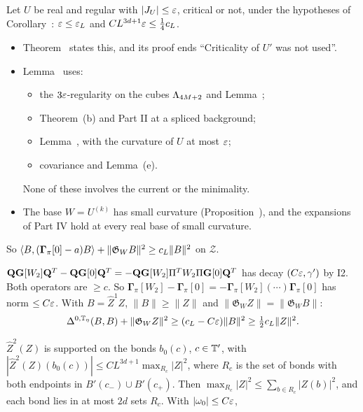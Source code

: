 \begin{detail}\label{d8:cg-real}
Let $U$ be real and regular with $|J_U|\le\varepsilon$, critical or not, under the hypotheses of Corollary~: $\varepsilon\le\varepsilon_L$ and $CL^{3d+1}\varepsilon\le\frac14c_L$.
\begin{step}
\begin{itemize}
\item Theorem~ states this, and its proof ends ``Criticality of $U'$ was not used''.
\item Lemma~ uses:
  \begin{itemize}
  \item the $3\varepsilon$-regularity on the cubes $\Lambda_{4M+2}$ and Lemma~;
  \item Theorem~(b) and Part II at a spliced background;
  \item Lemma~, with the curvature of $U$ at most $\varepsilon$;
  \item covariance and Lemma~(e).
  \end{itemize}
  None of these involves the current or the minimality.
\item The base $W=U^{(k)}$ has small curvature (Proposition~), and the expansions of Part IV hold at every real base of small curvature.
\end{itemize}
So $\langle B,(\boldsymbol\Gamma_\pi[0]-a)B\rangle+\|\mathfrak G_WB\|^2\ge c_L\|B\|^2$ on $\mathcal Z$.
\end{step}
\begin{step}
$\mathbf Q\mathbf G[W_2]\mathbf Q^T-\mathbf Q\mathbf G[0]\mathbf Q^T=-\mathbf Q\mathbf G[W_2]\Pi^TW_2\Pi\mathbf G[0]\mathbf Q^T$ has decay $(C\varepsilon,\gamma')$ by I2. Both operators are $\ge c$. So $\boldsymbol\Gamma_\pi[W_2]-\boldsymbol\Gamma_\pi[0]=-\boldsymbol\Gamma_\pi[W_2](\cdots)\boldsymbol\Gamma_\pi[0]$ has norm $\le C\varepsilon$. With $B=\hat Z^1Z$, $\|B\|\ge\|Z\|$ and $\|\mathfrak G_WZ\|=\|\mathfrak G_WB\|$:
\[
\Delta^{0,\mathbb T_\eta}(B,B)+\|\mathfrak G_WZ\|^2\ge(c_L-C\varepsilon)\|B\|^2\ge\tfrac12c_L\|Z\|^2 .
\]
\end{step}
\begin{step}
$\hat Z^2(Z)$ is supported on the bonds $b_0(c)$, $c\in\mathbb T'$, with $|\hat Z^2(Z)(b_0(c))|\le CL^{3d+1}\max_{R_c}|Z|^2$, where $R_c$ is the set of bonds with both endpoints in $B'(c_-)\cup B'(c_+)$. Then $\max_{R_c}|Z|^2\le\sum_{b\in R_c}|Z(b)|^2$, and each bond lies in at most $2d$ sets $R_c$. With $|\omega_0|\le C\varepsilon$,

\end{step}
\end{detail}
